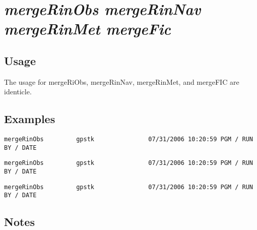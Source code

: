%
%

\section{\emph{mergeRinObs mergeRinNav mergeRinMet mergeFic}}
\subsection{Usage}
The usage for mergeRiObs, mergeRinNav, mergeRinMet, and mergeFIC are identicle.

\subsection{Examples}
\begin{\outputsize}
\begin{Verbatim}
mergeRinObs         gpstk               07/31/2006 10:20:59 PGM / RUN BY / DATE
\end{Verbatim}
\end{\outputsize}

\begin{\outputsize}
\begin{Verbatim}
mergeRinObs         gpstk               07/31/2006 10:20:59 PGM / RUN BY / DATE
\end{Verbatim}
\end{\outputsize}

\begin{\outputsize}
\begin{Verbatim}
mergeRinObs         gpstk               07/31/2006 10:20:59 PGM / RUN BY / DATE
\end{Verbatim}
\end{\outputsize}

\subsection{Notes}

%


